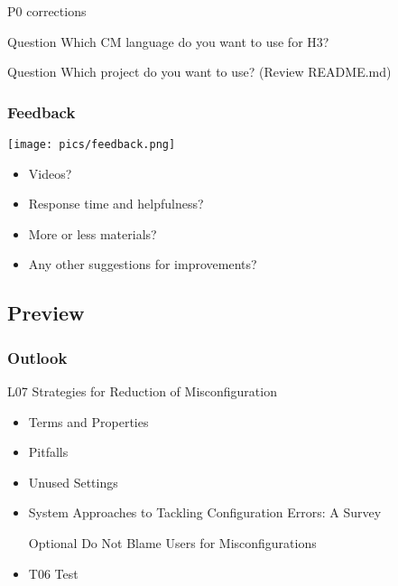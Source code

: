 \begin{assignment}
	P0 corrections
\end{assignment}

\begin{assignment}
	\begin{alertblock}{Question}
	Which CM language do you want to use for H3?
	\end{alertblock}
	\begin{alertblock}{Question}
	Which project do you want to use? (Review README.md)
	\end{alertblock}
\end{assignment}

\begin{frame}
	\frametitle{Feedback}
	\hfill \texttt{[image: pics/feedback.png]}
	\vspace{-1cm}
	\begin{itemize}
		\item Videos?
		\item Response time and helpfulness?
		\item More or less materials?
		\item Any other suggestions for improvements?
	\end{itemize}
\end{frame}


\subsection{Preview}

\begin{frame}
	\frametitle{Outlook}

	L07 Strategies for Reduction of Misconfiguration
	\begin{itemize} %
	\item Terms and Properties
	\item Pitfalls
	\item Unused Settings
	\tiny
	\item System Approaches to Tackling Configuration Errors: A Survey
	\item [Optional] Do Not Blame Users for Misconfigurations
	\item T06 Test
	\end{itemize}
\end{frame}



\appendix

\begin{frame}[allowframebreaks]
	
	
\end{frame}




